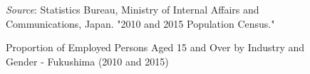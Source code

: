 \documentclass[a4paper,12pt]{article}
\begin{document}
\begin{figure}[!htbp]
\begin{minipage}{\textwidth}
        \vspace{0.1cm}
        
        \textit{Source}: Statistics Bureau, Ministry of Internal Affairs and Communications, Japan. "2010 and 2015 Population Census."
    \end{minipage}
    
    \caption{Proportion of Employed Persons Aged 15 and Over by Industry and Gender - Fukushima (2010 and 2015)} 
    \label{fig:fukushima_employment_combined}
\end{figure}


\end{document}
